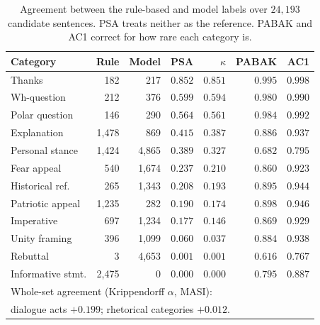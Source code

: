 \documentclass[journal]{IEEEtran}
\begin{document}
\begin{table}[h]
\caption{Agreement between the rule-based and model labels over $24{,}193$
candidate sentences. PSA treats neither as the reference. PABAK and AC1
correct for how rare each category is.}
\label{tab:kappa}
\centering
\footnotesize
\setlength{\tabcolsep}{3pt}
\begin{tabular}{lrrrrrr}
\toprule
Category & Rule & Model & PSA & $\kappa$ & PABAK & AC1 \\
\midrule
Thanks            & 182   & 217   & $0.852$ & $0.851$ & $0.995$ & $0.998$ \\
Wh-question       & 212   & 376   & $0.599$ & $0.594$ & $0.980$ & $0.990$ \\
Polar question    & 146   & 290   & $0.564$ & $0.561$ & $0.984$ & $0.992$ \\
Explanation       & 1{,}478 & 869 & $0.415$ & $0.387$ & $0.886$ & $0.937$ \\
Personal stance   & 1{,}424 & 4{,}865 & $0.389$ & $0.327$ & $0.682$ & $0.795$ \\
Fear appeal       & 540   & 1{,}674 & $0.237$ & $0.210$ & $0.860$ & $0.923$ \\
Historical ref.   & 265   & 1{,}343 & $0.208$ & $0.193$ & $0.895$ & $0.944$ \\
Patriotic appeal  & 1{,}235 & 282  & $0.190$ & $0.174$ & $0.898$ & $0.946$ \\
Imperative        & 697   & 1{,}234 & $0.177$ & $0.146$ & $0.869$ & $0.929$ \\
Unity framing     & 396   & 1{,}099 & $0.060$ & $0.037$ & $0.884$ & $0.938$ \\
Rebuttal          & 3     & 4{,}653 & $0.001$ & $0.001$ & $0.616$ & $0.767$ \\
Informative stmt. & 2{,}475 & 0    & $0.000$ & $0.000$ & $0.795$ & $0.887$ \\
\midrule
\multicolumn{7}{l}{Whole-set agreement (Krippendorff $\alpha$, MASI):} \\
\multicolumn{7}{l}{dialogue acts $+0.199$; rhetorical categories $+0.012$.} \\
\bottomrule
\end{tabular}
\end{table}
\end{document}
